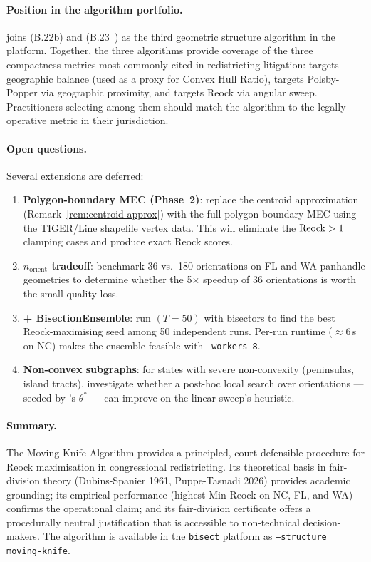\paragraph{Position in the algorithm portfolio.}
\mka{} joins \cvdgeo{} (B.22b) and \bfsg{} (B.23~\citep{dellaLibera2026bfs})
as the third geometric structure algorithm in the platform.
Together, the three algorithms provide coverage of the three compactness
metrics most commonly cited in redistricting litigation:
\bfsg{} targets geographic balance (used as a proxy for Convex Hull Ratio),
\cvdgeo{} targets Polsby-Popper via geographic proximity, and
\mka{} targets Reock via angular sweep.
Practitioners selecting among them should match the algorithm to the legally
operative metric in their jurisdiction.

\paragraph{Open questions.}
Several extensions are deferred:
\begin{enumerate}
\item \textbf{Polygon-boundary MEC (Phase~2)}: replace the centroid
  approximation (Remark~\ref{rem:centroid-approx}) with the full
  polygon-boundary MEC using the TIGER/Line shapefile vertex data.
  This will eliminate the $\mathrm{Reock}{} > 1$ clamping cases and produce
  exact Reock scores.

\item \textbf{$n_{\mathrm{orient}}$ tradeoff}: benchmark 36 vs.\ 180 orientations
  on FL and WA panhandle geometries to determine whether the 5$\times$
  speedup of 36 orientations is worth the small quality loss.

\item \textbf{\mka{} + BisectionEnsemble}: run \be{}$(T=50)$ with \mka{}
  bisectors to find the best Reock-maximising seed among 50 independent
  runs.
  Per-run runtime ($\approx$6\,s on NC) makes the ensemble feasible with
  \texttt{--workers 8}.

\item \textbf{Non-convex subgraphs}: for states with severe non-convexity
  (peninsulas, island tracts), investigate whether a post-hoc local search
  over orientations --- seeded by \mka{}'s $\theta^*$ --- can improve
  on the linear sweep's heuristic.
\end{enumerate}

\paragraph{Summary.}
The Moving-Knife Algorithm provides a principled, court-defensible
procedure for Reock maximisation in congressional redistricting.
Its theoretical basis in fair-division theory (Dubins-Spanier 1961,
Puppe-Tasnadi 2026) provides academic grounding; its empirical performance
(highest Min-Reock on NC, FL, and WA) confirms the operational claim;
and its fair-division certificate offers a procedurally neutral justification
that is accessible to non-technical decision-makers.
The algorithm is available in the \texttt{bisect} platform as
\texttt{--structure moving-knife}.
